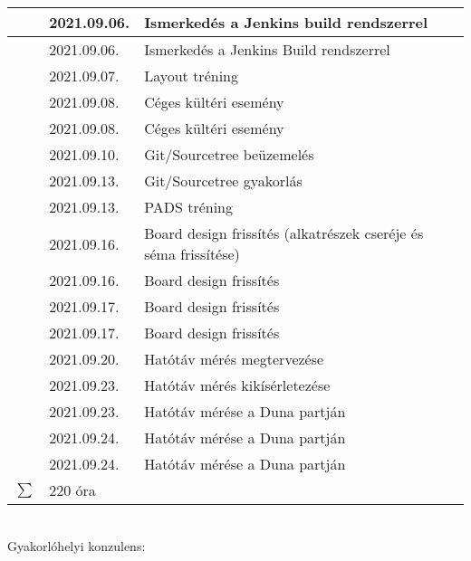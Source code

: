 \documentclass[10pt,a4paper,oneside]{report}
\newcounter{magicrownumbers}
\newcommand\rownum{\stepcounter{magicrownumbers}\arabic{magicrownumbers}}
\begin{document}
\begin{table}[h!]
\begin{tabular}{| c | p{3 cm} | p{10 cm} |}
	\rownum & 2021.09.06. & Ismerkedés a Jenkins build rendszerrel \\ \hline
	\rownum & 2021.09.06. & Ismerkedés a Jenkins Build rendszerrel \\ \hline
	\rownum & 2021.09.07. & Layout tréning \\ \hline
	\rownum & 2021.09.08. & Céges kültéri esemény \\ \hline
	\rownum & 2021.09.08. & Céges kültéri esemény \\ \hline
	\rownum & 2021.09.10. & Git/Sourcetree beüzemelés \\ \hline
	\rownum & 2021.09.13. & Git/Sourcetree gyakorlás \\ \hline
	\rownum & 2021.09.13. & PADS tréning \\ \hline
	\rownum & 2021.09.16. & Board design frissítés (alkatrészek cseréje és séma frissítése) \\ \hline
	\rownum & 2021.09.16. & Board design frissítés \\ \hline
	\rownum & 2021.09.17. & Board design frissítés \\ \hline
	\rownum & 2021.09.17. & Board design frissítés \\ \hline
	\rownum & 2021.09.20. & Hatótáv mérés megtervezése \\ \hline
	\rownum & 2021.09.23. & Hatótáv mérés kikísérletezése \\ \hline
	\rownum & 2021.09.23. & Hatótáv mérése a Duna partján \\ \hline
	\rownum & 2021.09.24. & Hatótáv mérése a Duna partján \\ \hline
	\rownum & 2021.09.24. & Hatótáv mérése a Duna partján \\ \hline
	$\sum$ & 220 óra& \\ \hline
	\end{tabular}
\end{table}
\vspace{.5 cm} \\
Gyakorlóhelyi konzulens:
\end{document}
